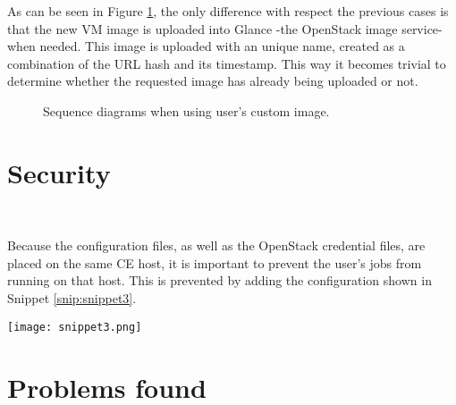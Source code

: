 \documentclass[a4paper]{jpconf}
\begin{document}
As can be seen in Figure \ref{fig:custom}, 
the only difference with respect the previous cases is that the new VM image is uploaded into Glance -the OpenStack image service- when needed.
This image is uploaded with an unique name, 
created as a combination of the URL hash and its timestamp. 
This way it becomes trivial to determine whether the requested image has already being uploaded or not. 

\begin{figure}[h]
    \centering
    \qquad
    \caption{Sequence diagrams when using user's custom image.}%
    \label{fig:custom}%
\end{figure}


\section{Security}

~

Because the configuration files, as well as the OpenStack credential files, 
are placed on the same CE host, it is important to prevent the user's jobs from running on that host.
This is prevented by adding the configuration shown in Snippet \ref{snip:snippet3}.


\begin{snippet}[h]
    \centering
    \renewcommand\figurename{Snippet}
    \texttt{[image: snippet3.png]}
    \caption{Setup to prevent user's jobs being forked at the HTCondor-CE host.}
    \label{snip:snippet3}
\end{snippet}



\section{Problems found}
\end{document}
